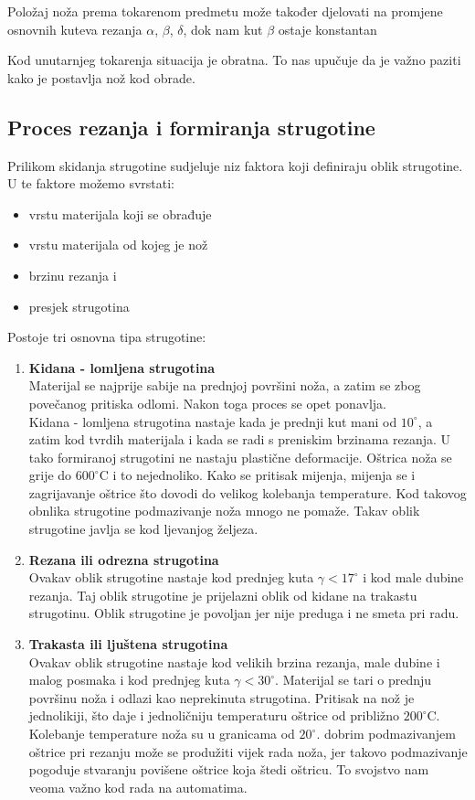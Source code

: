 \documentclass[a4paper,12pt]{article}
\numberwithin{figure}{section}
\begin{document}

Položaj noža prema tokarenom predmetu može također djelovati na promjene osnovnih kuteva rezanja $\alpha$, $\beta$, $\delta$, dok nam kut $\beta$ ostaje konstantan




Kod unutarnjeg tokarenja situacija je obratna. To nas upučuje da je važno paziti kako je postavlja nož kod obrade. 
\subsection{Proces rezanja i formiranja strugotine}
Prilikom skidanja strugotine sudjeluje niz faktora koji definiraju oblik strugotine. U te faktore možemo svrstati:
\begin{itemize}
\item vrstu materijala koji se obrađuje
\item vrstu materijala od kojeg je nož
\item brzinu rezanja i 
\item presjek strugotina
\end{itemize}
Postoje tri osnovna tipa strugotine:
\begin{enumerate}
\item \textbf{Kidana - lomljena strugotina}\\
Materijal se najprije sabije na prednjoj površini noža, a zatim se zbog povečanog pritiska odlomi. Nakon toga proces se opet ponavlja. \\
Kidana - lomljena strugotina nastaje kada je prednji kut mani od $10^{\circ}$, a zatim kod tvrdih materijala i kada se radi s preniskim brzinama rezanja. U tako formiranoj strugotini ne nastaju plastične deformacije. Oštrica noža se grije do $600^{\circ}$C i to nejednoliko. Kako se pritisak mijenja, mijenja se i zagrijavanje oštrice što dovodi do velikog kolebanja temperature. Kod takovog obnlika strugotine podmazivanje noža mnogo ne pomaže. Takav oblik strugotine javlja se kod ljevanjog željeza.
\item \textbf{Rezana ili odrezna strugotina}\\
Ovakav oblik strugotine nastaje kod prednjeg kuta $\gamma < 17^{\circ}$ i kod male dubine rezanja. Taj oblik strugotine je prijelazni oblik od kidane na trakastu strugotinu. Oblik strugotine je povoljan jer nije preduga i ne smeta pri radu. 
\item \textbf{Trakasta ili ljuštena strugotina}\\
Ovakav oblik strugotine nastaje kod velikih brzina rezanja, male dubine i malog posmaka i kod prednjeg kuta $\gamma<30^{\circ}$. Materijal se tari o prednju površinu noža i odlazi kao neprekinuta strugotina. Pritisak na nož je jednolikiji, što daje i jednoličniju temperaturu oštrice od približno $200^{\circ}$C. Kolebanje temperature noža su u granicama od $20^{\circ}$. dobrim podmazivanjem oštrice pri rezanju može se produžiti vijek rada noža, jer takovo podmazivanje pogoduje stvaranju povišene oštrice koja štedi oštricu. To svojstvo nam veoma važno kod rada na automatima.
\end{enumerate}
\end{document}

